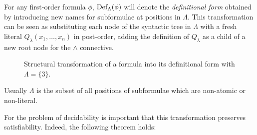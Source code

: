 For any first-order formula \(\phi\), \(\fldef{\Lambda}{\phi}\) will denote the \emph{definitional form} obtained by introducing new names for subformulae at positions in \(\Lambda\).
This transformation can be seen as substituting each node of the syntactic tree in \(\Lambda\) with a fresh literal \(Q_\lambda(x_1,\ldots,x_n)\) in post-order, adding the definition of \(Q_\lambda\) as a child of a new root node for the \(\land\) connective.

\begin{figure}[H]
  \centering
  \begin{minipage}[t]{.3\textwidth}
  \end{minipage}
  \begin{minipage}[t]{.3\textwidth}
  \end{minipage}
  \caption{Structural transformation of a formula into its definitional form with \(\Lambda = \{3\}\).}\label{fig:definitional-form}
\end{figure}

Usually \(\Lambda\) is the subset of all positions of subformulae which are non-atomic or non-literal.

For the problem of decidability is important that this transformation preserves satisfiability. Indeed, the following theorem holds:

